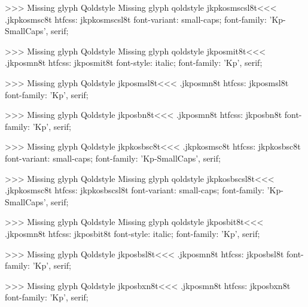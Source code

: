 >>>
Missing glyph	Qoldstyle
Missing glyph	qoldstyle
\<jkpkosmscsl8t\><<<
.jkpkosmsc8t
htfcss:  jkpkosmscsl8t  font-variant: small-caps; font-family: 'Kp-SmallCaps', serif;

>>>
Missing glyph	Qoldstyle
Missing glyph	qoldstyle
\<jkposmit8t\><<<
.jkposmn8t
htfcss:  jkposmit8t  font-style: italic; font-family: 'Kp', serif;

>>>
Missing glyph	Qoldstyle
\<jkposmsl8t\><<<
.jkposmn8t
htfcss:  jkposmsl8t  font-family: 'Kp', serif;

>>>
Missing glyph	Qoldstyle
\<jkposbn8t\><<<
.jkposmn8t
htfcss:  jkposbn8t  font-family: 'Kp', serif;

>>>
Missing glyph	Qoldstyle
\<jkpkosbsc8t\><<<
.jkpkosmsc8t
htfcss:  jkpkosbsc8t  font-variant: small-caps; font-family: 'Kp-SmallCaps', serif;

>>>
Missing glyph	Qoldstyle
Missing glyph	qoldstyle
\<jkpkosbscsl8t\><<<
.jkpkosmsc8t
htfcss:  jkpkosbscsl8t  font-variant: small-caps; font-family: 'Kp-SmallCaps', serif;

>>>
Missing glyph	Qoldstyle
Missing glyph	qoldstyle
\<jkposbit8t\><<<
.jkposmn8t
htfcss:  jkposbit8t  font-style: italic; font-family: 'Kp', serif;

>>>
Missing glyph	Qoldstyle
\<jkposbsl8t\><<<
.jkposmn8t
htfcss:  jkposbsl8t  font-family: 'Kp', serif;

>>>
Missing glyph	Qoldstyle
\<jkposbxn8t\><<<
.jkposmn8t
htfcss:  jkposbxn8t  font-family: 'Kp', serif;

